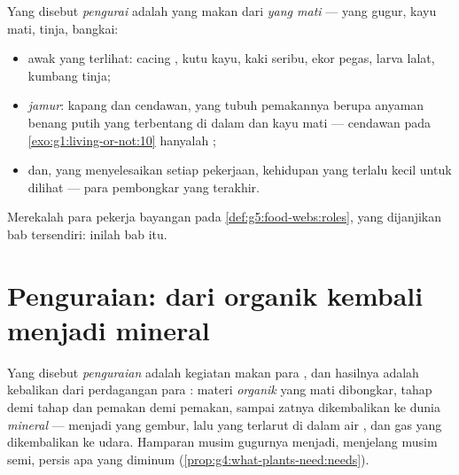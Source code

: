 \begin{definition}[Pengurai]\label{def:g6:decomposers-and-soil:decomposers}
Yang disebut \emph{pengurai} adalah  yang
makan dari \emph{ yang mati} ---  yang gugur, kayu
mati, tinja, bangkai:
\begin{itemize}
  \item awak yang terlihat: cacing , kutu kayu, kaki seribu, ekor
        pegas, larva lalat, kumbang tinja;
  \item \emph{jamur}: kapang dan cendawan, yang tubuh
        pemakannya berupa anyaman benang putih yang terbentang di dalam
         dan kayu mati --- cendawan pada
        \cref{exo:g1:living-or-not:10} hanyalah ;
  \item dan, yang menyelesaikan setiap pekerjaan, kehidupan  yang
        terlalu kecil untuk dilihat --- para pembongkar yang terakhir.
\end{itemize}
Merekalah para pekerja bayangan pada \cref{def:g5:food-webs:roles},
yang dijanjikan bab tersendiri: inilah bab itu.
\end{definition}

\section{Penguraian: dari organik kembali menjadi mineral}

\begin{proposition}\label{prop:g6:decomposers-and-soil:decomposition}
Yang disebut \emph{penguraian} adalah kegiatan makan
para , dan hasilnya adalah kebalikan dari perdagangan para
: materi \emph{organik} yang mati dibongkar, tahap demi tahap
dan pemakan demi pemakan, sampai zatnya dikembalikan ke dunia
\emph{mineral} --- menjadi  yang gembur, lalu  yang
terlarut di dalam air , dan gas yang dikembalikan ke udara.
Hamparan musim gugurnya menjadi, menjelang musim semi, persis apa yang
diminum  (\cref{prop:g4:what-plants-need:needs}).
\end{proposition}
\admitted


